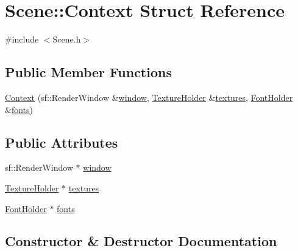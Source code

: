 \hypertarget{struct_scene_1_1_context}{}\section{Scene\+:\+:Context Struct Reference}
\label{struct_scene_1_1_context}


{\ttfamily \#include $<$Scene.\+h$>$}

\subsection*{Public Member Functions}
\begin{DoxyCompactItemize}
\item 
\hyperlink{struct_scene_1_1_context_ac08956521e8de60178029d2fe236819b}{Context} (sf\+::\+Render\+Window \&\hyperlink{struct_scene_1_1_context_a4ea0d87e64ed3888a01bfb67e7ac1b84}{window}, \hyperlink{_resource_identifiers_8h_a96220f9135333a0209f9367a28b7da13}{Texture\+Holder} \&\hyperlink{struct_scene_1_1_context_a6ec97ee92bfa4d09abc6edc9508d0050}{textures}, \hyperlink{_resource_identifiers_8h_ac2733d29d4a4d26a739742097fc51ede}{Font\+Holder} \&\hyperlink{struct_scene_1_1_context_ae8a09bf6b99a1081940f2f2d73db0272}{fonts})
\end{DoxyCompactItemize}
\subsection*{Public Attributes}
\begin{DoxyCompactItemize}
\item 
sf\+::\+Render\+Window $\ast$ \hyperlink{struct_scene_1_1_context_a4ea0d87e64ed3888a01bfb67e7ac1b84}{window}
\item 
\hyperlink{_resource_identifiers_8h_a96220f9135333a0209f9367a28b7da13}{Texture\+Holder} $\ast$ \hyperlink{struct_scene_1_1_context_a6ec97ee92bfa4d09abc6edc9508d0050}{textures}
\item 
\hyperlink{_resource_identifiers_8h_ac2733d29d4a4d26a739742097fc51ede}{Font\+Holder} $\ast$ \hyperlink{struct_scene_1_1_context_ae8a09bf6b99a1081940f2f2d73db0272}{fonts}
\end{DoxyCompactItemize}


\subsection{Constructor \& Destructor Documentation}
\hypertarget{struct_scene_1_1_context_ac08956521e8de60178029d2fe236819b}{}\label{struct_scene_1_1_context_ac08956521e8de60178029d2fe236819b} 
